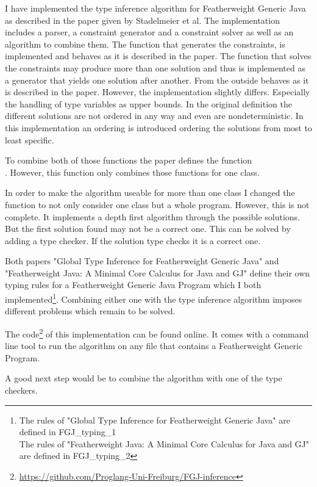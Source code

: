 I have implemented the type inference algorithm for Featherweight Generic Java as described in the paper\cite{FGJ} given by Stadelmeier et al.
The implementation includes a parser, a constraint generator and a constraint solver as well as an algorithm to combine them.
The function  that generates the constraints, is implemented and behaves as it is described in the paper.
The function  that solves the constraints may produce more than one solution and thus is implemented as a generator that
yields one solution after another. From the outside  behaves as it is described in the paper. However, the implementation slightly
differs. Especially the handling of type variables as upper bounds. In the original definition the different solutions are not ordered in any way
and even are nondeterministic. In this implementation an ordering is introduced ordering the solutions from most to least specific.

To combine both of those functions the paper defines the function\\. However, this function only combines those functions
for one class.

In order to make the algorithm useable for more than one class I changed the function  to not only consider one class but a whole
program. However, this is not complete. It implements a depth first algorithm through the possible solutions. But the first solution found
may not be a correct one. This can be solved by adding a type checker. If the solution type checks it is a correct one.

Both papers "Global Type Inference for Featherweight Generic Java"\cite{FGJ} and "Featherweight Java: A Minimal Core
Calculus for Java and GJ"\cite{FJ} define their own typing rules for a Featherweight Generic Java Program which I both implemented\footnote{The rules of "Global Type Inference for Featherweight Generic Java" are defined in FGJ\_typing\_1\\The rules of "Featherweight Java: A Minimal Core Calculus for Java and GJ" are defined in FGJ\_typing\_2}.
Combining either one with the type inference algorithm imposes different problems which remain to be solved.

The code\footnote{\url{https://github.com/Proglang-Uni-Freiburg/FGJ-inference}} of this implementation can be found online. It comes with a command line tool to run the algorithm on any file that contains a
Featherweight Generic Program.

A good next step would be to combine the algorithm with one of the type checkers.
